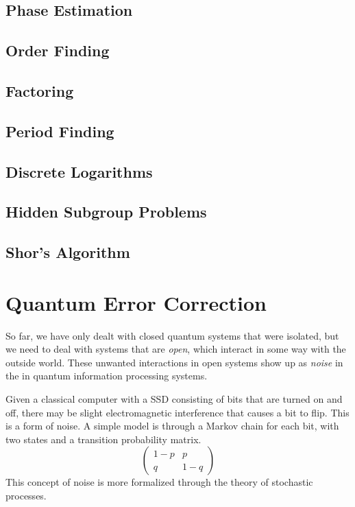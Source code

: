\documentclass{article}
\begin{document}
  \subsection{Phase Estimation}

  \subsection{Order Finding}

  \subsection{Factoring}

  \subsection{Period Finding} 

  \subsection{Discrete Logarithms}

  \subsection{Hidden Subgroup Problems}

  \subsection{Shor's Algorithm}

\section{Quantum Error Correction}

  So far, we have only dealt with closed quantum systems that were isolated, but we need to deal with systems that are \textit{open}, which interact in some way with the outside world. These unwanted interactions in open systems show up as \textit{noise} in the in quantum information processing systems. 

  \begin{example}
    Given a classical computer with a SSD consisting of bits that are turned on and off, there may be slight electromagnetic interference that causes a bit to flip. This is a form of noise. A simple model is through a Markov chain for each bit, with two states and a transition probability matrix.  
    \begin{equation}
      \begin{pmatrix} 1 - p & p \\ q & 1 - q \end{pmatrix}
    \end{equation}
    This concept of noise is more formalized through the theory of stochastic processes. 
  \end{example}
\end{document}
